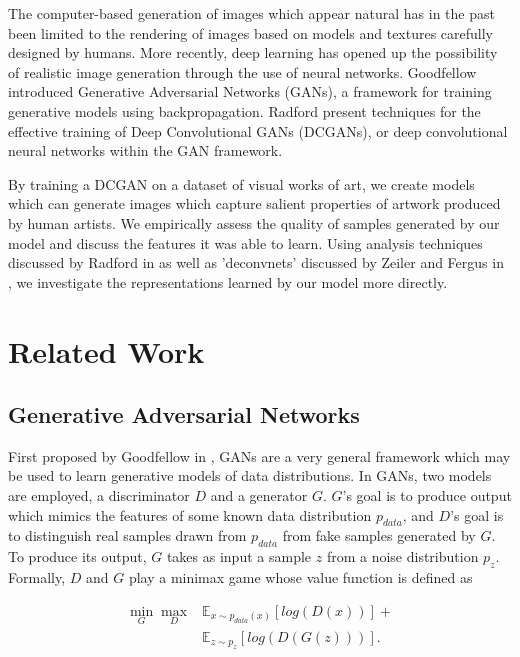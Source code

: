 \documentclass[10pt,twocolumn,letterpaper]{article}
\begin{document}
The computer-based generation of images which appear natural has in the past been limited to
the rendering of images based on models and textures carefully designed by humans. More recently,
deep learning has opened up the possibility of realistic image generation through the use of neural
networks. Goodfellow \etal \cite{goodfellow2014generative} introduced Generative Adversarial Networks
(GANs), a framework for training generative models using backpropagation. Radford \etal
\cite{radford2015unsupervised} present techniques for the effective training of Deep Convolutional
GANs (DCGANs), or deep convolutional neural networks within the GAN framework.

By training a DCGAN on a dataset of visual works of art, we create models which can generate images
which capture salient properties of artwork produced by human artists. We empirically assess the
quality of samples generated by our model and discuss the features it was able to learn.
Using analysis techniques discussed by Radford \etal in \cite{radford2015unsupervised} as well as 'deconvnets' discussed by Zeiler and Fergus in \cite{zeiler2014visualizing}, we investigate
the representations learned by our model more directly.

\section{Related Work}
\subsection{Generative Adversarial Networks}
First proposed by Goodfellow \etal in \cite{goodfellow2014generative}, GANs are a very general
framework which may be used to learn generative models of data distributions. In GANs, two models
are employed, a discriminator $ D $ and a generator $ G $. $ G $'s goal is to produce output
which mimics the features of some known data distribution $ p_{data} $, and $ D $'s goal is to distinguish
real samples drawn from $ p_{data} $ from fake samples generated by $ G $. To produce its output, $ G $
takes as input a sample $ z $ from a noise distribution $ p_{z} $. Formally, $ D $ and $ G $ play
a minimax game whose value function is defined as

\begin{equation}
\begin{aligned}
\min_{G} \max_{D}  & \mathbb{E}_{x \sim p_{data}(x)}[log(D(x))]	+ \\
				   & \mathbb{E}_{z \sim p_{z}}[log(D(G(z)))].
\end{aligned}
\end{equation}
\end{document}
